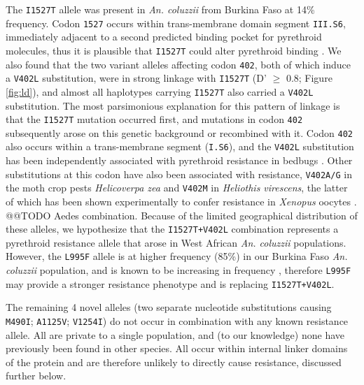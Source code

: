 \documentclass[a4paper,11pt,abstracton,hidelinks]{scrartcl}
\begin{document}
%
The \texttt{I1527T} allele was present in \textit{An. coluzzii} from Burkina Faso at 14\% frequency.
%
Codon \texttt{1527} occurs within trans-membrane domain segment \texttt{III.S6}, immediately adjacent to a second predicted binding pocket for pyrethroid molecules, thus it is plausible that \texttt{I1527T} could alter pyrethroid binding \cite{Dong2014}.
%
We also found that the two variant alleles affecting codon \texttt{402}, both of which induce a \texttt{V402L} substitution, were in strong linkage with \texttt{I1527T} (D' $\geq$ 0.8; Figure \ref{fig:ld}), and almost all haplotypes carrying \texttt{I1527T} also carried a \texttt{V402L} substitution.
%
The most parsimonious explanation for this pattern of linkage is that the \texttt{I1527T} mutation occurred first, and mutations in codon \texttt{402} subsequently arose on this genetic background or recombined with it.
%
Codon \texttt{402} also occurs within a trans-membrane segment (\texttt{I.S6}), and the \texttt{V402L} substitution has been independently associated with pyrethroid resistance in bedbugs \cite{Yoon2008}.
%
Other substitutions at this codon have also been associated with resistance, \texttt{V402A/G} in the moth crop pests \emph{Helicoverpa zea} \cite{Hopkins2010} and \texttt{V402M} in \emph{Heliothis virescens}, the latter of which has been shown experimentally to confer resistance in \textit{Xenopus} oocytes \cite{Park1997, Lee2013}.
%
@@TODO Aedes combination.
%
Because of the limited geographical distribution of these alleles, we hypothesize that the \texttt{I1527T+V402L} combination represents a pyrethroid resistance allele that arose in West African \textit{An. coluzzii} populations.
%
However, the \texttt{L995F} allele is at higher frequency (85\%) in our Burkina Faso \textit{An. coluzzii} population, and is known to be increasing in frequency \cite{Toe2014}, therefore \texttt{L995F} may provide a stronger resistance phenotype and is replacing \texttt{I1527T+V402L}.


%
The remaining 4 novel alleles (two separate nucleotide substitutions causing \texttt{M490I}; \texttt{A1125V}; \texttt{V1254I}) do not occur in combination with any known resistance allele.
%
All are private to a single population, and (to our knowledge) none have previously been found in other species.
%
All occur within internal linker domains of the protein and are therefore unlikely to directly cause resistance, discussed further below.


\end{document}
